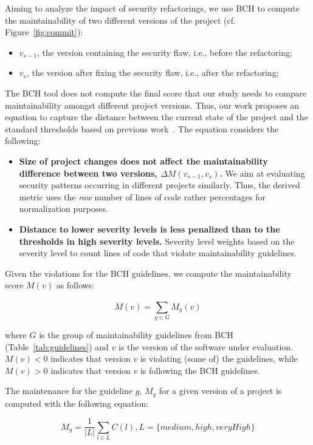\documentclass[10pt,conference]{IEEEtran}
\begin{document}
Aiming to analyze the impact of security refactorings, we use BCH to compute the
maintainability of two different versions of the project (cf. Figure~\ref{fig:commit}):
\begin{itemize}
	\item $v_{s-1}$, the version containing the security flaw, i.e., before the
	refactoring;
	\item $v_{s}$, the version after fixing the security flaw, i.e., after the
	refactoring;
\end{itemize}

The BCH tool does not compute the final score that our study needs to compare
maintainability amongst different project versions. Thus, our work proposes an
equation to capture the distance between the current state of the project and
the standard thresholds based on previous work~\cite{Olivari:2018}. The equation
considers the following:
\begin{itemize}
	\item \textbf{Size of project changes does not affect the maintainability
	difference between two versions, $\Delta M (v_{s-1},v_{s})$.} We
	aim at evaluating security patterns occurring in different projects similarly.
	Thus, the derived metric uses the \textit{raw} number of lines of code rather
  percentages for normalization purposes.
	\item \textbf{Distance to lower severity levels is less penalized than to the
	thresholds in high severity levels.} Severity level weights based on the
	severity level to count lines of code that violate maintainability guidelines.
\end{itemize}

Given the violations for the BCH guidelines, we compute the maintainability score
$M(v)$ as follows:

\begin{equation}
    M(v) = \sum_{g \in G}^{} M_{g}(v)
\end{equation}

\noindent
where $G$ is the group of maintainability guidelines from BCH
(Table~\ref{tab:guidelines}) and $v$ is the version of the software under
evaluation. $M(v) < 0$ indicates that version $v$ is violating (some of) the
guidelines, while $M(v) > 0$ indicates that version $v$ is following
the BCH guidelines.

The maintenance for the guideline $g$, $M_g$ for a given version
of a project is computed with the following equation:

\begin{equation}
    M_{g} = \frac{1}{|L|} \sum_{l \in L}^{} C(l) , L = \{medium, high, veryHigh\}
\end{equation}
\end{document}
